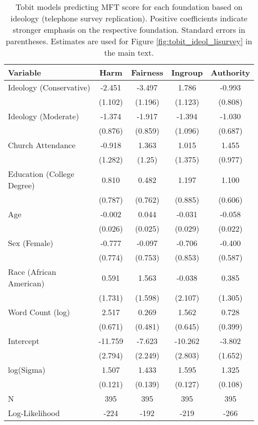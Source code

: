 \begin{table}[ht]
\centering
\caption{Tobit models predicting MFT score for each foundation based 
           on ideology (telephone survey replication). Positive coefficients indicate stronger emphasis on the respective 
           foundation. Standard errors in parentheses. Estimates are used for Figure 
           \ref{fig:tobit_ideol_lisurvey} in the main text.} 
\label{tab:tobit_ideol_lisurvey}
\begingroup\footnotesize
\begin{tabular}{lcccc}
  \hline
Variable & Harm & Fairness & Ingroup & Authority \\ 
  \hline
Ideology (Conservative) &  -2.451 & -3.497 &   1.786 & -0.993 \\ 
   & (1.102) & (1.196) & (1.123) & (0.808) \\ 
  Ideology (Moderate) &  -1.374 & -1.917 &  -1.394 & -1.030 \\ 
   & (0.876) & (0.859) & (1.096) & (0.687) \\ 
  Church Attendance &  -0.918 &  1.363 &   1.015 &  1.455 \\ 
   & (1.282) & (1.25) & (1.375) & (0.977) \\ 
  Education (College Degree) &   0.810 &  0.482 &   1.197 &  1.100 \\ 
   & (0.787) & (0.762) & (0.885) & (0.606) \\ 
  Age &  -0.002 &  0.044 &  -0.031 & -0.058 \\ 
   & (0.026) & (0.025) & (0.029) & (0.022) \\ 
  Sex (Female) &  -0.777 & -0.097 &  -0.706 & -0.400 \\ 
   & (0.774) & (0.753) & (0.853) & (0.587) \\ 
  Race (African American) &   0.591 &  1.563 &  -0.038 &  0.385 \\ 
   & (1.731) & (1.598) & (2.107) & (1.305) \\ 
  Word Count (log) &   2.517 &  0.269 &   1.562 &  0.728 \\ 
   & (0.671) & (0.481) & (0.645) & (0.399) \\ 
  Intercept & -11.759 & -7.623 & -10.262 & -3.802 \\ 
   & (2.794) & (2.249) & (2.803) & (1.652) \\ 
  log(Sigma) &   1.507 &  1.433 &   1.595 &  1.325 \\ 
   & (0.121) & (0.139) & (0.127) & (0.108) \\ 
   \hline
N & 395 & 395 & 395 & 395 \\ 
  Log-Likelihood & -224 & -192 & -219 & -266 \\ 
   \hline
\end{tabular}
\endgroup
\end{table}
